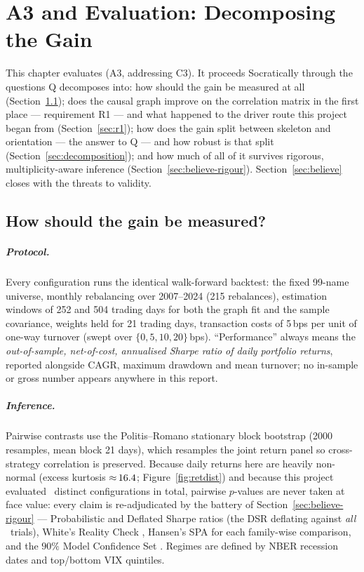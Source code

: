 \chapter{A3 and Evaluation: Decomposing the Gain}
\label{chap:evaluation}

This chapter evaluates (A3, addressing C3). It proceeds Socratically through
the questions Q decomposes into: how should the gain be measured at all
(Section~\ref{sec:method}); does the causal graph improve on the correlation
matrix in the first place --- requirement R1 --- and what happened to the
driver route this project began from (Section~\ref{sec:r1}); how does the
gain split between skeleton and orientation --- the answer to Q ---
and how robust is that split (Section~\ref{sec:decomposition}); and how much
of all of it survives rigorous, multiplicity-aware inference
(Section~\ref{sec:believe-rigour}). Section~\ref{sec:believe} closes with the
threats to validity.

\section{How should the gain be measured?}
\label{sec:method}

\paragraph{Protocol.} Every configuration runs the identical walk-forward
backtest: the fixed 99-name universe, monthly rebalancing over 2007--2024
(215 rebalances), estimation windows of 252 and 504 trading days for both the
graph fit and the sample covariance, weights held for 21 trading days,
transaction costs of 5\,bps per unit of one-way turnover (swept over
$\{0,5,10,20\}$\,bps). ``Performance'' always means the \emph{out-of-sample,
net-of-cost, annualised Sharpe ratio of daily portfolio returns}, reported
alongside CAGR, maximum drawdown and mean turnover; no in-sample or gross
number appears anywhere in this report.

\paragraph{Inference.} Pairwise contrasts use the Politis--Romano stationary
block bootstrap \cite{politis1994stationary} (2000 resamples, mean block 21
days), which resamples the joint return panel so cross-strategy correlation
is preserved. Because daily returns here are heavily non-normal (excess
kurtosis ${\approx}\,16.4$; Figure~\ref{fig:retdist}) and because this
project evaluated \rsNtrials\ distinct configurations in total, pairwise
$p$-values are never taken at face value: every claim is re-adjudicated by
the battery of Section~\ref{sec:believe-rigour} --- Probabilistic and
Deflated Sharpe ratios \cite{bailey2012psr,bailey2014deflated} (the DSR
deflating against \emph{all} \rsNtrials\ trials), White's Reality Check
\cite{white2000reality}, Hansen's SPA \cite{hansen2005spa} for each
family-wise comparison, and the $90\%$ Model Confidence Set
\cite{hansen2011mcs}. Regimes are defined by NBER recession dates and
top/bottom VIX quintiles.

